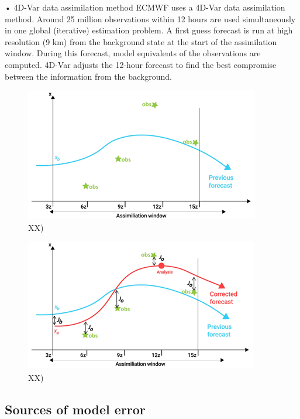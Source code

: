 \documentclass[12pt,oneside]{book}
\begin{document}
\begin{enumerate}
  • 4D-Var data assimilation method ECMWF uses a 4D-Var data
  assimilation method. Around 25 million observations within 12 hours
  are used simultaneously in one global (iterative) estimation problem.
  A first guess forecast is run at high resolution (9 km) from the
  background state at the start of the assimilation window. During this
  forecast, model equivalents of the observations are computed. 4D-Var
  adjusts the 12-hour forecast to find the best compromise between the
  information from the background.
\end{enumerate}

\begin{figure}

{\centering \includegraphics[width=0.8\linewidth]{figures/Figure75} 

}

\caption{XX)}\label{fig:DataAssimilation3}
\end{figure}

\begin{figure}

{\centering \includegraphics[width=0.8\linewidth]{figures/Figure76} 

}

\caption{XX)}\label{fig:DataAssimilation4}
\end{figure}

\subsection{Sources of model error}\label{sources-of-model-error}
\end{document}
